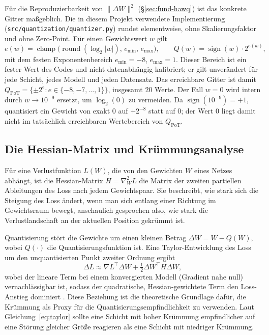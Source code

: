 Für die Reproduzierbarkeit von $\|\Delta W\|^2$ (\S\ref{sec:fund-hawq}) ist das konkrete Gitter maßgeblich. Die in diesem Projekt verwendete Implementierung (\texttt{src/quantization/quantizer.py}) rundet elementweise, ohne Skalierungsfaktor und ohne Zero-Point. Für einen Gewichtswert $w$ gilt
\[
e(w) = \operatorname{clamp}\bigl(\operatorname{round}(\log_2|w|),\, e_{\min},\, e_{\max}\bigr), \qquad Q(w) = \operatorname{sign}(w)\cdot 2^{e(w)},
\]
mit dem festen Exponentenbereich $e_{\min}=-8$, $e_{\max}=1$. Dieser Bereich ist ein fester Wert des Codes und nicht datenabhängig kalibriert; er gilt unverändert für jede Schicht, jedes Modell und jeden Datensatz. Das erreichbare Gitter ist damit $Q_{\mathrm{PoT}} = \{\pm 2^{e} : e \in \{-8,-7,\dots,1\}\}$, insgesamt $20$ Werte. Der Fall $w=0$ wird intern durch $w \to 10^{-9}$ ersetzt, um $\log_2(0)$ zu vermeiden. Da $\operatorname{sign}(10^{-9})=+1$, quantisiert ein Gewicht von exakt $0$ auf $+2^{-8}$ statt auf $0$; der Wert $0$ liegt damit nicht im tatsächlich erreichbaren Wertebereich von $Q_{\mathrm{PoT}}$.

\subsection{Die Hessian-Matrix und Krümmungsanalyse}
\label{sec:fund-hessian}

Für eine Verlustfunktion $L(W)$, die von den Gewichten $W$ eines Netzes abhängt, ist die Hessian-Matrix $H = \nabla^2_W L$ die Matrix der zweiten partiellen Ableitungen des Loss nach jedem Gewichtspaar. Sie beschreibt, wie stark sich die Steigung des Loss ändert, wenn man sich entlang einer Richtung im Gewichtsraum bewegt, anschaulich gesprochen also, wie stark die Verlustlandschaft an der aktuellen Position gekrümmt ist.
\par\medskip

Quantisierung stört die Gewichte um einen kleinen Betrag $\Delta W = W - Q(W)$, wobei $Q(\cdot)$ die Quantisierungsfunktion ist. Eine Taylor-Entwicklung des Loss um den unquantisierten Punkt zweiter Ordnung ergibt
\begin{equation}
\Delta L \approx \nabla L^\top \Delta W + \tfrac{1}{2}\Delta W^\top H \Delta W,
\label{eq:taylor}
\end{equation}
wobei der lineare Term bei einem konvergierten Modell (Gradient nahe null) vernachlässigbar ist, sodass der quadratische, Hessian-gewichtete Term den Loss-Anstieg dominiert \citep{dong_hawqv2_2020}. Diese Beziehung ist die theoretische Grundlage dafür, die Krümmung als Proxy für die Quantisierungsempfindlichkeit zu verwenden. Laut Gleichung~\eqref{eq:taylor} sollte eine Schicht mit hoher Krümmung empfindlicher auf eine Störung gleicher Größe reagieren als eine Schicht mit niedriger Krümmung.
\par\medskip


